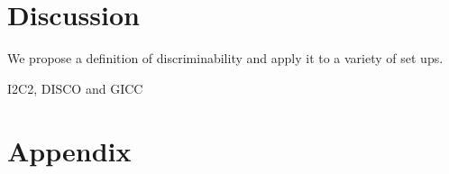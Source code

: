 \documentclass{article}
\begin{document}
\section{Discussion}

 We propose a definition of discriminability and apply it to a variety of set ups.

 I2C2, DISCO and GICC



\section{Appendix}


% 
% 
% 
% 
% 
% 
% 
% 



\appendix






\newpage
\small{


}
\end{document}
